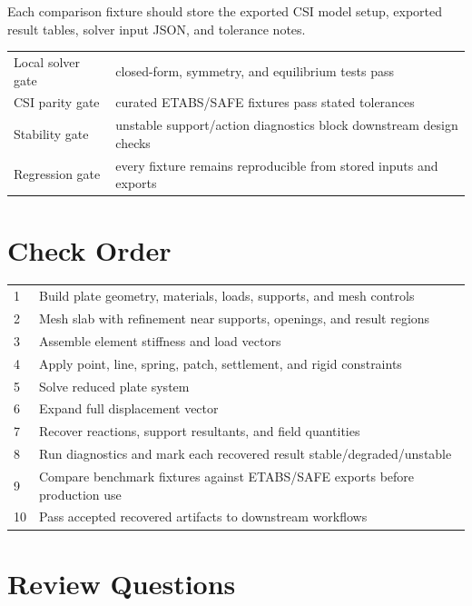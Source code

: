 \documentclass[10pt]{article}
\begin{document}
Each comparison fixture should store the exported CSI model setup, exported
result tables, solver input JSON, and tolerance notes.


{\ttfamily\footnotesize
\begin{tabular}{@{}p{1.8in}p{4.7in}@{}}
Local solver gate & closed-form, symmetry, and equilibrium tests pass \\
CSI parity gate & curated ETABS/SAFE fixtures pass stated tolerances \\
Stability gate & unstable support/action diagnostics block downstream design checks \\
Regression gate & every fixture remains reproducible from stored inputs and exports \\
\end{tabular}
}

\section{Check Order}

{\ttfamily\footnotesize
\begin{tabular}{@{}p{0.8in}p{5.9in}@{}}
1 & Build plate geometry, materials, loads, supports, and mesh controls \\
2 & Mesh slab with refinement near supports, openings, and result regions \\
3 & Assemble element stiffness and load vectors \\
4 & Apply point, line, spring, patch, settlement, and rigid constraints \\
5 & Solve reduced plate system \\
6 & Expand full displacement vector \\
7 & Recover reactions, support resultants, and field quantities \\
8 & Run diagnostics and mark each recovered result stable/degraded/unstable \\
9 & Compare benchmark fixtures against ETABS/SAFE exports before production use \\
10 & Pass accepted recovered artifacts to downstream workflows \\
\end{tabular}
}

\section{Review Questions}
\end{document}
